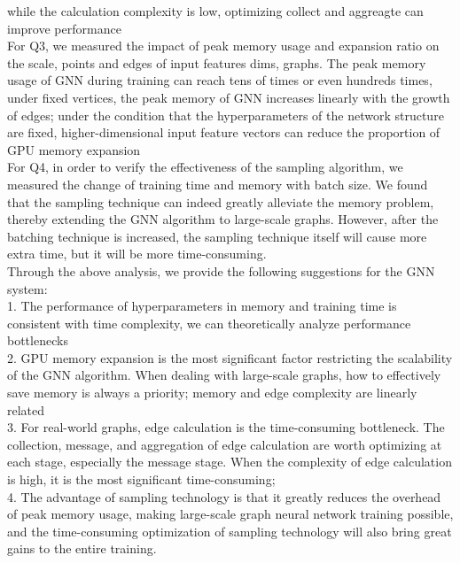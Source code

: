 while the calculation complexity is low, optimizing collect and aggreagte can improve performance \\
For Q3, we measured the impact of peak memory usage and expansion ratio on the scale, points and edges of input features dims, graphs. 
The peak memory usage of GNN during training can reach tens of times or even hundreds times, under fixed vertices, 
the peak memory of GNN increases linearly with the growth of edges; 
under the condition that the hyperparameters of the network structure are fixed, 
higher-dimensional input feature vectors can reduce the proportion of GPU memory expansion \\
For Q4, in order to verify the effectiveness of the sampling algorithm, we measured the change of training time
and memory with batch size. 
We found that the sampling technique can indeed greatly alleviate the memory problem, 
thereby extending the GNN algorithm to large-scale graphs. However, after the batching technique is increased, 
the sampling technique itself will cause more extra time, but it will be more time-consuming.\\
Through the above analysis, we provide the following suggestions for the GNN system:\\
1. The performance of hyperparameters in memory and training time is consistent with time complexity, 
we can theoretically analyze performance bottlenecks\\
2. GPU memory expansion is the most significant factor restricting the scalability of the GNN algorithm. 
When dealing with large-scale graphs, how to effectively save memory is always a priority; memory and edge complexity are linearly related \\
3. For real-world graphs, edge calculation is the time-consuming bottleneck. 
The collection, message, and aggregation of edge calculation are worth optimizing at each stage, especially the message stage. 
When the complexity of edge calculation is high, it is the most significant time-consuming; \\
4. The advantage of sampling technology is that it greatly reduces the overhead of peak memory usage, 
making large-scale graph neural network training possible, 
and the time-consuming optimization of sampling technology will also bring great gains to the entire training.